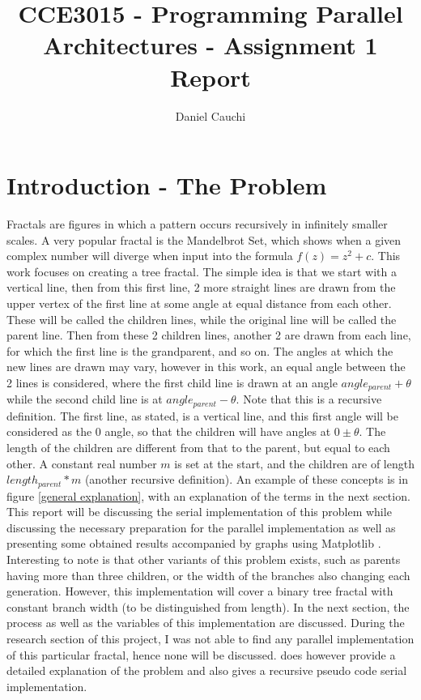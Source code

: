 \documentclass[11pt]{article}
\begin{document}
\title{CCE3015 - Programming Parallel Architectures - Assignment 1 Report}
\author{Daniel Cauchi}
\date{}
\maketitle

\section{Introduction - The Problem} \label{intro}
Fractals are figures in which a pattern occurs recursively in infinitely smaller scales. A very popular fractal is the Mandelbrot Set, which shows when a given complex number will diverge when input into the formula $f(z) = z^2 + c$. This work focuses on creating a tree fractal. The simple idea is that we start with a vertical line, then from this first line, 2 more straight lines are drawn from the upper vertex of the first line at some angle at equal distance from each other. These will be called the children lines, while the original line will be called the parent line. Then from these 2 children lines, another 2 are drawn from each line, for which the first line is the grandparent, and so on. The angles at which the new lines are drawn may vary, however in this work, an equal angle between the 2 lines is considered, where the first child line is drawn at an angle $angle_{parent} + \theta$ while the second child line is at $angle_{parent} - \theta$. Note that this is a recursive definition. The first line, as stated, is a vertical line, and this first angle will be considered as the 0 angle, so that the children will have angles at $0\pm \theta$. The length of the children are different from that to the parent, but equal to each other. A constant real number $m$ is set at the start, and the children are of length $length_{parent} * m$ (another recursive definition). An example of these concepts is in figure \ref{general explanation}, with an explanation of the terms in the next section. This report will be discussing the serial implementation of this problem while discussing the necessary preparation for the parallel implementation as well as presenting some obtained results accompanied by graphs using Matplotlib \cite{matplotlib}. Interesting to note is that other variants of this problem exists, such as parents having more than three children, or the width of the branches also changing each generation. However, this implementation will cover a binary tree fractal with constant branch width (to be distinguished from length). In the next section, the process as well as the variables of this implementation are discussed. During the research section of this project, I was not able to find any parallel implementation of this particular fractal, hence none will be discussed. \cite{natureofcode} does however provide a detailed explanation of the problem and also gives a recursive pseudo code serial implementation.
\end{document}
